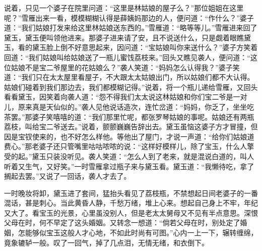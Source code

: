 \begin{parag}
    说着，只见一个婆子在院里问道：“这里是林姑娘的屋子么？”那位姐姐在这里呢？”雪雁出来一看，模模糊糊认得是薛姨妈那边的人，便问道：“作什么？”婆子道：“我们姑娘打发来给这里林姑娘送东西的。”雪雁道：“略等等儿。”雪雁进来回了黛玉，黛玉便叫领他进来。那婆子进来请了安，且不说送什么，只是觑着眼瞧黛玉，看的黛玉脸上倒不好意思起来，因问道：“宝姑娘叫你来送什么？”婆子方笑着回道：“我们姑娘叫给姑娘送了一瓶儿蜜饯荔枝来。”回头又瞧见袭人，便问道：“这位姑娘不是宝二爷屋里的花姑娘么？”袭人笑道：“妈妈怎么认得我？”婆子笑道：“我们只在太太屋里看屋子，不大跟太太姑娘出门，所以姑娘们都不大认得。姑娘们碰着到我们那边去，我们都模糊记得。”说着，将一个瓶儿递给雪雁，又回头看看黛玉，因笑着向袭人道：“怨不得我们太太说这林姑娘和你们宝二爷是一对儿，原来真是天仙似的。”袭人见他说话造次，连忙岔道：“妈妈，你乏了，坐坐吃茶罢。”那婆子笑嘻嘻的道：“我们那里忙呢，都张罗琴姑娘的事呢。姑娘还有两瓶荔枝，叫给宝二爷送去。”说着，颤颤巍巍告辞出去。黛玉虽恼这婆子方才冒撞，但因是宝钗使来的，也不好怎么样他。等他出了屋门，才说一声道：“给你们姑娘道费心。”那老婆子还只管嘴里咕咕哝哝的说：“这样好模样儿，除了宝玉，什么人擎受的起。”黛玉只装没听见。袭人笑道：“怎么人到了老来，就是混说白道的，叫人听着又生气，又好笑。”一时雪雁拿过瓶子来与黛玉看。黛玉道：“我懒待吃，拿了搁起去罢。”又说了一回话，袭人才去了。
\end{parag}


\begin{parag}
    一时晚妆将卸，黛玉进了套间，猛抬头看见了荔枝瓶，不禁想起日间老婆子的一番混话，甚是刺心。当此黄昏人静，千愁万绪，堆上心来。想起自己身上不牢，年纪又大了。看宝玉的光景，心里虽没别人，但是老太太舅母又不见有半点意思。深恨父母在时，何不早定了这头婚姻。又转念一想道：“倘若父母在时，别处定了婚姻，怎能够似宝玉这般人才心地，不如此时尚有可图。”心内一上一下，辗转缠绵，竟象辘轳一般。叹了一回气，掉了几点泪，无情无绪，和衣倒下。
\end{parag}


